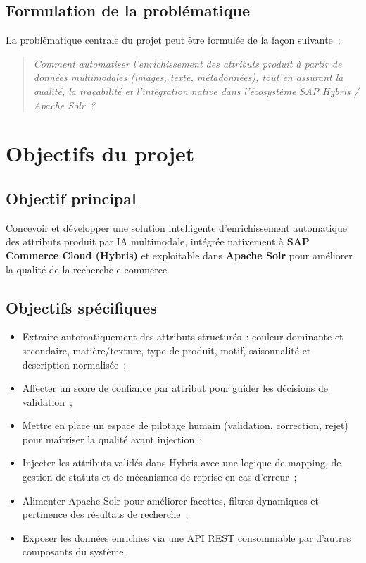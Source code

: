 \subsection{Formulation de la problématique}
La problématique centrale du projet peut être formulée de la façon suivante~:

\begin{quote}
\textit{Comment automatiser l'enrichissement des attributs produit à partir de données multimodales (images, texte, métadonnées), tout en assurant la qualité, la traçabilité et l'intégration native dans l'écosystème SAP Hybris / Apache Solr~?}
\end{quote}

\section{Objectifs du projet}

\subsection{Objectif principal}
Concevoir et développer une solution intelligente d'enrichissement automatique des attributs produit par IA multimodale, intégrée nativement à \textbf{SAP Commerce Cloud (Hybris)} et exploitable dans \textbf{Apache Solr} pour améliorer la qualité de la recherche e-commerce.

\subsection{Objectifs spécifiques}
\begin{itemize}
  \item Extraire automatiquement des attributs structurés~: couleur dominante et secondaire, matière/texture, type de produit, motif, saisonnalité et description normalisée~;
  \item Affecter un score de confiance par attribut pour guider les décisions de validation~;
  \item Mettre en place un espace de pilotage humain (validation, correction, rejet) pour maîtriser la qualité avant injection~;
  \item Injecter les attributs validés dans Hybris avec une logique de mapping, de gestion de statuts et de mécanismes de reprise en cas d'erreur~;
  \item Alimenter Apache Solr pour améliorer facettes, filtres dynamiques et pertinence des résultats de recherche~;
  \item Exposer les données enrichies via une API REST consommable par d'autres composants du système.
\end{itemize}

